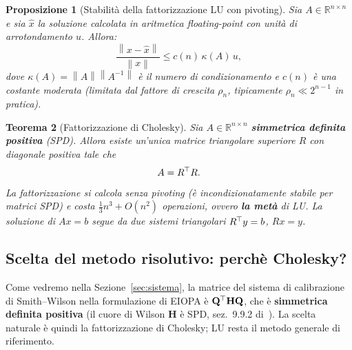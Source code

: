 \documentclass[11pt,a4paper]{article}
\theoremstyle{plain}
\newtheorem{teorema}{Teorema}[section]
\newtheorem{proposizione}[teorema]{Proposizione}
\theoremstyle{definition}
\theoremstyle{remark}
\newcommand{\R}{\mathbb{R}}
\newcommand{\Hmat}{\mathbf{H}}
\newcommand{\Qmat}{\mathbf{Q}}
\newcommand{\transp}{^{\mskip-1mu\top}}
\newcommand{\norm}[1]{\left\lVert #1 \right\rVert}
\begin{document}
\begin{proposizione}[Stabilit\`a della fattorizzazione LU con pivoting]
\label{prop:stab_lu}
Sia $A\in\R^{n\times n}$ e sia $\hat{x}$ la soluzione calcolata in aritmetica
floating-point con unit\`a di arrotondamento $u$. Allora:
\[
  \frac{\norm{x - \hat{x}}}{\norm{x}} \le c(n)\,\kappa(A)\,u,
\]
dove $\kappa(A) = \norm{A}\norm{A^{-1}}$ \`e il numero di condizionamento e
$c(n)$ \`e una costante moderata (limitata dal fattore di crescita $\rho_n$,
tipicamente $\rho_n \ll 2^{n-1}$ in pratica).
\end{proposizione}

\begin{teorema}[Fattorizzazione di Cholesky]
\label{thm:chol}
Sia $A\in\R^{n\times n}$ \textbf{simmetrica definita positiva} (SPD). Allora
esiste un'unica matrice triangolare superiore $R$ con diagonale positiva tale che
\[
  A = R\transp R .
\]
La fattorizzazione si calcola \emph{senza pivoting} (è incondizionatamente stabile
per matrici SPD) e costa $\tfrac13 n^3 + O(n^2)$ operazioni, ovvero \textbf{la metà}
di LU. La soluzione di $A x = b$ segue da due sistemi triangolari $R\transp y = b$,
$R x = y$.
\end{teorema}

\subsection{Scelta del metodo risolutivo: perch\`e Cholesky?}
\label{sec:scelta_metodo}

Come vedremo nella Sezione~\ref{sec:sistema}, la matrice del sistema di
calibrazione di Smith--Wilson nella formulazione di EIOPA è
$\Qmat\transp\Hmat\Qmat$, che è \textbf{simmetrica definita positiva} (il cuore
di Wilson $\Hmat$ è SPD, sez.~9.9.2 di~\cite{eiopa2025}). La scelta naturale è
quindi la fattorizzazione di Cholesky; LU resta il metodo generale di riferimento.
\end{document}

